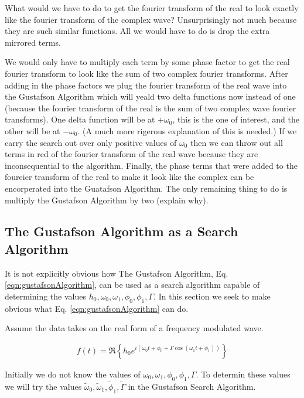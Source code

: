 \documentclass[onecolumn, groupedaddress, 10pt]{revtex4-1}
\begin{document}
What would we have to do to get the fourier transform of the real to look exactly like the fourier transform of the complex wave?  Unsurprisingly not much because they are such similar functions.  All we would have to do is drop the extra mirrored terms.


We would only have to multiply each term by some phase factor to get the real fourier transform to look like the sum of two complex fourier transforms.  After adding in the phase factors we plug the  fourier transform of the real wave into the Gustafson Algorithm which will yeald two delta functions now instead of one (because the fourier transform of the real is the sum of two complex wave fourier transforms).  One delta function will be at $+\omega_0$, this is the one of interest, and the other will be at $-\omega_0$.  (A much more rigerous explanation of this is needed.)  If we carry the search out over only positive values of $\omega_0$ then we can throw out all terms in red of the fourier transform of the real wave because they are inconsequential to the algorithm.  Finally, the phase terms that were added to the foureier transform of the real to make it look like the complex can be encorperated into the Guatafson Algorithm.  The only remaining thing to do is multiply the Gustafson Algorithm by two (explain why).


\subsection{The Gustafson Algorithm as a Search Algorithm}
It is not explicitly obvious how The Gustafson Algorithm, Eq. \ref{eqn:gustafsonAlgorithm}, can be used as a search algorithm capable of determining the values $h_0, \omega_0, \omega_1, \phi_0, \phi_1, \Gamma$.  In this section we seek to make obvious what Eq. \ref{eqn:gustafsonAlgorithm} can do.  

Assume the data takes on the real form of a frequency modulated wave.

\begin{align}
\label{eqn:realData}
f(t) = \Re \left\{ h_0 e^{i\left( \omega_0 t + \phi_0 + \Gamma \cos( \omega_1 t + \phi_1 ) \right)} \right\}
\end{align}

Initially we do not know the values of $\omega_0, \omega_1, \phi_0, \phi_1, \Gamma$.  To determin these values we will try the values $\widetilde{\omega}_0, \widetilde{\omega}_1, \widetilde{\phi}_1, \widetilde{\Gamma}$ in the Gustafson Search Algorithm.
\end{document}
